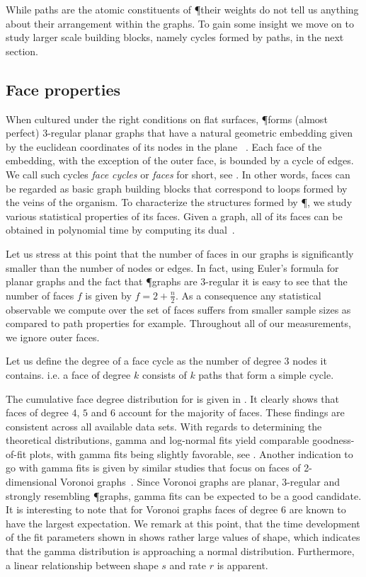 		While paths are the atomic constituents of \P their weights do not tell us anything about their arrangement within the graphs. To gain some insight we move on to study larger scale building blocks, namely cycles formed by paths, in the next section.

	\subsection{Face properties}

		When cultured under the right conditions on flat surfaces, \P forms (almost perfect) $3$-regular planar graphs that have a natural geometric embedding given by the euclidean coordinates of its nodes in the plane ~\cite{baumgarten2010plasmodial}. Each face of the embedding, with the exception of the outer face, is bounded by a cycle of edges. We call such cycles \emph{face cycles} or \emph{faces} for short, see . In other words, faces can be regarded as basic graph building blocks that correspond to loops formed by the veins of the organism. To characterize the structures formed by \P, we study various statistical properties of its faces. Given a graph, all of its faces can be obtained in polynomial time by computing its dual~\cite{mehlhorn1995leda}. 

		Let us stress at this point that the number of faces in our graphs is significantly smaller than the number of nodes or edges. In fact, using Euler's formula for planar graphs and the fact that \P graphs are $3$-regular it is easy to see that the number of faces $f$ is given by $f = 2 + \frac{n}{2}$. As a consequence any statistical observable we compute over the set of faces suffers from smaller sample sizes as compared to path properties for example. Throughout all of our measurements, we ignore outer faces.

		Let us define the degree of a face cycle as the number of degree $3$ nodes it contains. i.e. a face of degree $k$ consists of $k$ paths that form a simple cycle. 

		The cumulative face degree distribution for  is given in . It clearly shows that faces of degree $4$, $5$ and $6$ account for the majority of faces. These findings are consistent across all available data sets. With regards to determining the theoretical distributions, gamma and log-normal fits yield comparable goodness-of-fit plots, with gamma fits being slightly favorable, see . Another indication to go with gamma fits is given by similar studies that focus on faces of 2-dimensional Voronoi graphs~\cite{hinde1980monte,tanemura2003statistical}. Since Voronoi graphs are planar, $3$-regular and strongly resembling \P graphs, gamma fits can be expected to be a good candidate. It is interesting to note that for Voronoi graphs faces of degree $6$ are known to have the largest expectation. We remark at this point, that the time development of the fit parameters shown in  shows rather large values of shape, which indicates that the gamma distribution is approaching a normal distribution. Furthermore, a linear relationship between shape $s$ and rate $r$ is apparent.
 
